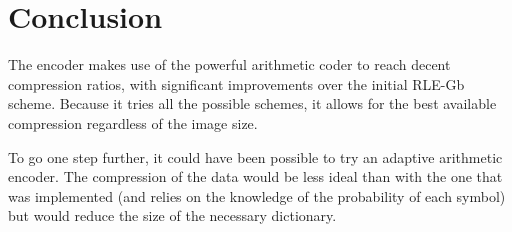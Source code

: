 \section{Conclusion}

The encoder makes use of the powerful arithmetic coder to reach decent compression ratios, with significant improvements over the initial RLE-Gb scheme. Because it tries all the possible schemes, it allows for the best available compression regardless of the image size.

To go one step further, it could have been possible to try an adaptive arithmetic encoder. The compression of the data would be less ideal than with the one that was implemented (and relies on the knowledge of the probability of each symbol) but would reduce the size of the necessary dictionary.